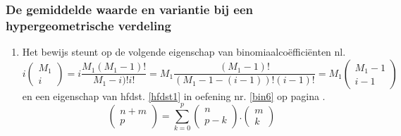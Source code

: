 {\subsubsection{De gemiddelde waarde en variantie bij een hypergeometrische 
verdeling}
\begin{enumerate}
\item {}
Het bewijs steunt op  de volgende eigenschap van binomiaalco\"effici\"enten nl.\
$$i\left(\begin{array}{c}
M_1\\
i
\end{array}
\right)=i\frac{M_1(M_1-1)!}{M_1-i)!i!}=M_1\frac{(M_1-1)!}{(M_1-1-(i-1))!(i-1)!}=M_1\left(\begin{array}{c}
M_1-1\\
i-1
\end{array}
\right)$$
en een eigenschap 
 van hfdst. \ref{hfdst1} in oefening nr. \ref{bin6} op pagina \pageref{bin6}.
$$\left(\begin{array}{c}n+m\\p\end{array}\right)=\sum_{k=0}^p
\left(\begin{array}{c}n\\p-k\end{array}\right).
\left(\begin{array}{c}m\\k\end{array}\right)$$


\end{enumerate}}
